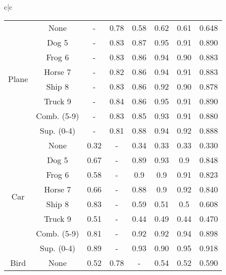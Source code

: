 \documentclass[acmtog, nonacm]{acmart}
\begin{document}
\begin{tabular}{c|c}
\begin{tabular}{@{}c|c|ccccc|c@{}}
\multirow{8}{*}{Plane} &None                           & -     & 0.78 & 0.58 & 0.62 & 0.61 & 0.648                     \\
                       & Dog    5                  & -     & 0.83 & 0.87 & 0.95 & 0.91 & 0.890                \\
                       & Frog   6                  & -     & 0.83 & 0.86 & 0.94 & 0.90 & 0.883                \\
                       & Horse 7                   & -     & 0.82 & 0.86 & 0.94 & 0.91 & 0.883                \\
                       & Ship   8                  & -     & 0.83 & 0.86 & 0.92 & 0.90 & 0.878                \\
                       & Truck 9                   & -     & 0.84 & 0.86 & 0.95 & 0.91 & 0.890                \\
                       & Comb. (5-9)               & -     & 0.83 & 0.85 & 0.93 & 0.91 & 0.880                \\
                       & Sup. (0-4)                & -     & 0.81 & 0.88 & 0.94 & 0.92 & 0.888                \\
                       \midrule
\multirow{8}{*}{Car}   & None                      & 0.32  & -    & 0.34 & 0.33 & 0.33 & 0.330                \\
                       & Dog    5                  & 0.67  & -    & 0.89 & 0.93 & 0.9  & 0.848                \\
                       & Frog   6                  & 0.58  & -    & 0.9  & 0.9  & 0.91 & 0.823                \\
                       & Horse 7                   & 0.66  & -    & 0.88 & 0.9  & 0.92 & 0.840                \\
                       & Ship   8                  & 0.83  & -    & 0.59 & 0.51 & 0.5  & 0.608                \\
                       & Truck 9                   & 0.51  & -    & 0.44 & 0.49 & 0.44 & 0.470                \\
                       & Comb. (5-9)               & 0.81  & -    & 0.92 & 0.92 & 0.94 & 0.898                \\
                       & Sup. (0-4)                & 0.89  & -    & 0.93 & 0.90 & 0.95 & 0.918                \\
                       \midrule
\multirow{8}{*}{Bird}  & None                      & 0.52  & 0.78 & -    & 0.54 & 0.52 & 0.590                \\

\end{tabular}
\end{tabular}
\end{document}
